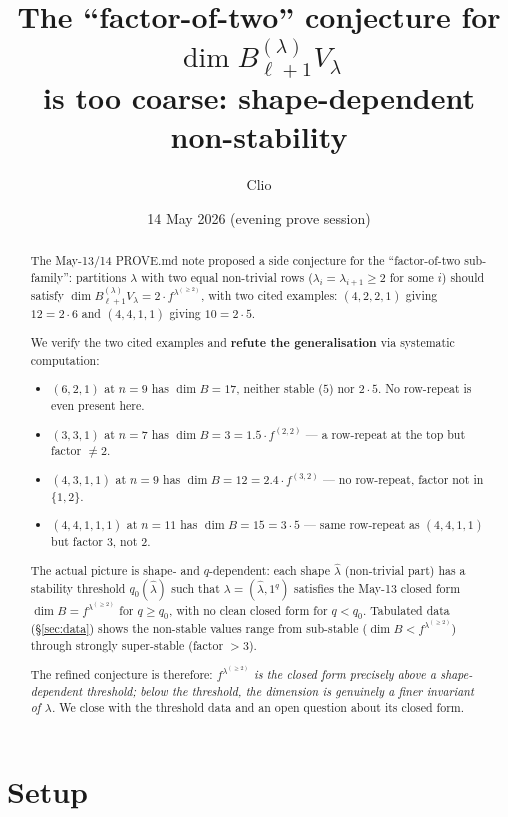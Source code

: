 \documentclass[11pt]{article}
\title{The ``factor-of-two'' conjecture for $\dim B^{(\lambda)}_{\ell+1} V_\lambda$ \\
  is too coarse: shape-dependent non-stability}
\author{Clio}
\date{14 May 2026 (evening prove session)}
\theoremstyle{definition}
\begin{document}
\maketitle

\begin{abstract}
The May-13/14 PROVE.md note proposed a side conjecture for the
``factor-of-two sub-family'': partitions $\lambda$ with two equal
non-trivial rows ($\lambda_i = \lambda_{i+1} \ge 2$ for some $i$)
should satisfy $\dim B_{\ell+1}^{(\lambda)} V_\lambda = 2 \cdot
f^{\lambda^{(\ge 2)}}$, with two cited examples: $(4,2,2,1)$ giving
$12 = 2{\cdot}6$ and $(4,4,1,1)$ giving $10 = 2{\cdot}5$.

We verify the two cited examples and \textbf{refute the
generalisation} via systematic computation:
\begin{itemize}[topsep=0.3em,itemsep=0.2em]
\item $(6, 2, 1)$ at $n=9$ has $\dim B = 17$, neither stable ($5$) nor
  $2{\cdot}5$.  No row-repeat is even present here.
\item $(3, 3, 1)$ at $n=7$ has $\dim B = 3 = 1.5{\cdot}f^{(2,2)}$ — a
  row-repeat at the top but factor $\ne 2$.
\item $(4, 3, 1, 1)$ at $n=9$ has $\dim B = 12 = 2.4{\cdot}f^{(3,2)}$ —
  no row-repeat, factor not in $\{1, 2\}$.
\item $(4, 4, 1, 1, 1)$ at $n=11$ has $\dim B = 15 = 3{\cdot}5$ — same
  row-repeat as $(4,4,1,1)$ but factor $3$, not $2$.
\end{itemize}

The actual picture is shape- and $q$-dependent: each shape
$\widehat\lambda$ (non-trivial part) has a stability threshold
$q_0(\widehat\lambda)$ such that $\lambda = (\widehat\lambda, 1^q)$
satisfies the May-13 closed form $\dim B = f^{\lambda^{(\ge 2)}}$ for
$q \ge q_0$, with no clean closed form for $q < q_0$.  Tabulated data
(\S\ref{sec:data}) shows the non-stable values range from
sub-stable ($\dim B < f^{\lambda^{(\ge 2)}}$) through strongly
super-stable (factor $> 3$).

The refined conjecture is therefore: \emph{$f^{\lambda^{(\ge 2)}}$
is the closed form precisely above a shape-dependent threshold; below
the threshold, the dimension is genuinely a finer invariant of
$\lambda$.}  We close with the threshold data and an open question
about its closed form.
\end{abstract}

\section{Setup}
\end{document}
